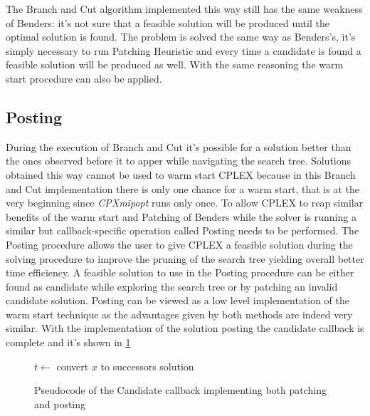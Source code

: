 The Branch and Cut algorithm implemented this way still has the same weakness of Benders: it's not sure that a feasible solution will be produced until the optimal solution is found.
The problem is solved the same way as Benders's, it's simply necessary to run Patching Heuristic and every time a candidate is found a feasible solution will be produced as well.
With the same reasoning the warm start procedure can also be applied.

\subsection{Posting}
During the execution of Branch and Cut it's possible for a solution better than the ones observed before it to apper while navigating the search tree.
Solutions obtained this way cannot be used to warm start CPLEX because in this Branch and Cut implementation there is only one chance for a warm start, that is at the very beginning since \textit{CPXmipopt} runs only once.
To allow CPLEX to reap similar benefits of the warm start and Patching of Benders while the solver is running a similar but callback-specific operation called Posting needs to be performed.
The Posting procedure allows the user to give CPLEX a feasible solution during the solving procedure to improve the pruning of the search tree yielding overall better time efficiency.
A feasible solution to use in the Posting procedure can be either found as candidate while exploring the search tree or by patching an invalid candidate solution.
Posting can be viewed as a low level implementation of the warm start technique as the advantages given by both methods are indeed very similar.
With the implementation of the solution posting the candidate callback is complete and it's shown in \figurename{ \ref{fig:callbackComplete}}

\begin{figure}[htbp]
	\begin{algorithm}[H]
		\vspace{2mm}
		$t \gets$ convert $x$ to successors solution\\
	\end{algorithm}
	\caption{Pseudocode of the Candidate callback implementing both patching and posting} \label{fig:callbackComplete}
\end{figure}

